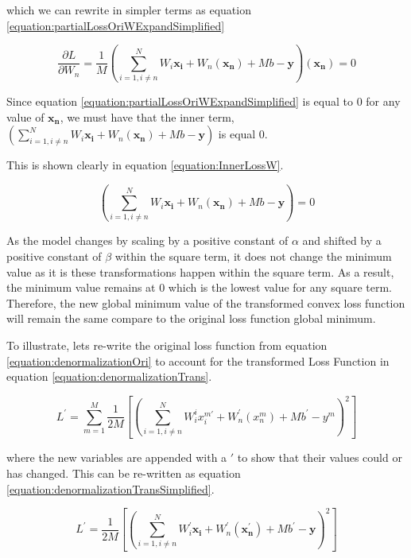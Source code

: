 \documentclass[a4paper,12pt]{article}
\begin{document}
which we can rewrite in simpler terms as equation \ref{equation:partialLossOriWExpandSimplified}

\begin{equation}
\label{equation:partialLossOriWExpandSimplified}
\frac{\partial L}{\partial W_{n}} = \frac{1}{M} (\sum_{i = 1, i  \neq n}^{N}W_{i}\mathbf{x_{i}} + W_{n}(\mathbf{x_{n}}) + Mb - \mathbf{y})(\mathbf{x_{n}}) = 0
\end{equation}

Since equation \ref{equation:partialLossOriWExpandSimplified} is equal to $0$ for any value of $\mathbf{x_{n}}$, we must have that the inner term, 
$(\sum_{i = 1, i  \neq n}^{N}W_{i}\mathbf{x_{i}} + W_{n}(\mathbf{x_{n}}) + Mb - \mathbf{y})$ is equal 0. 

This is shown clearly in equation \ref{equation:InnerLossW}. 

\begin{equation}
\label{equation:InnerLossW}
(\sum_{i = 1, i  \neq n}^{N}W_{i}\mathbf{x_{i}} + W_{n}(\mathbf{x_{n}}) + Mb - \mathbf{y}) = 0
\end{equation}

As the model changes by scaling by a positive constant of $\alpha$ and shifted by a positive constant of $\beta$ within the square term, it does not change the minimum value as it is these transformations happen within the square term. As a result, the minimum value remains at 0 which is the lowest value for any square term. Therefore, the new global minimum value of the transformed convex loss function will remain the same compare to the original loss function global minimum. 

To illustrate, lets re-write the original loss function from equation \ref{equation:denormalizationOri} to account for the transformed Loss Function in equation \ref{equation:denormalizationTrans}. 

\begin{equation}
\label{equation:denormalizationTrans}
L^{'} = \sum_{m=1}^{M} \frac{1}{2M} \left[(\sum_{i = 1, i  \neq n}^{N}W_{i}^{i}x_{i}^{m'} + W_{n}^{'}(x_{n}^{m}) + Mb^{'} - y^{m})^{2}\right] 
\end{equation}

where the new variables are appended with a $'$ to show that their values could or has changed. This can be re-written as equation \ref{equation:denormalizationTransSimplified}. 

\begin{equation}
\label{equation:denormalizationTransSimplified}
L^{'} = \frac{1}{2M} \left[(\sum_{i = 1, i  \neq n}^{N}W_{i}^{'}\mathbf{x_{i}} + W_{n}^{'}(\mathbf{x_{n}^{'}}) + Mb^{'} - \mathbf{y})^{2}\right] 
\end{equation}
\end{document}
